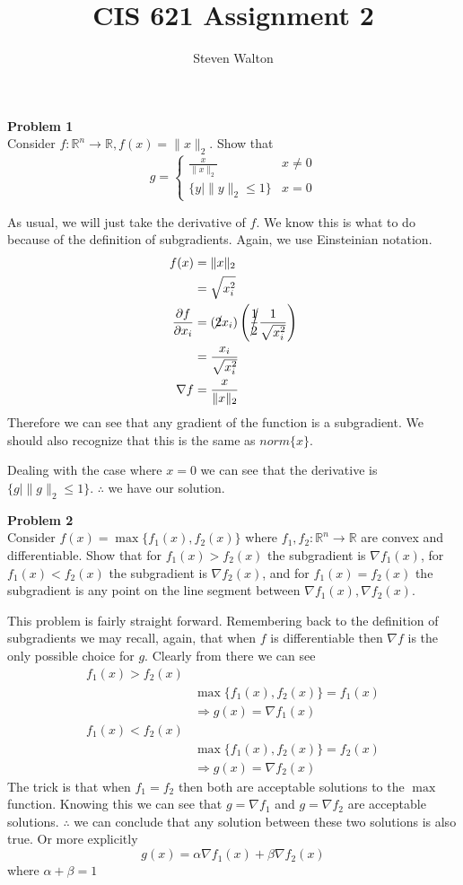 \documentclass[12pt,letter]{article}
\newcommand{\problem}[1]{\vspace{3mm}\Large\textbf{{Problem {#1}\vspace{3mm}}}\normalsize\\}
\begin{document}
\title{CIS 621 Assignment 2}
\author{Steven Walton}
\maketitle
\problem{1}
Consider $f:\mathbb{R}^n \rightarrow \mathbb{R}, f(x) = \|x\|_2$. Show that 
\[ 
g = 
\begin{cases}
    \frac{x}{\|x\|_2} & x \neq 0\\
    \{y | \|y\|_2 \leq 1\} & x = 0
\end{cases}
\]

As usual, we will just take the derivative of $f$. We know this is what to do
because of the definition of subgradients. Again, we use Einsteinian notation.
\begin{align*}
    f(x) &= \|x\|_2 \\
         &= \sqrt{x_i^2} \\
    \frac{\partial f}{\partial x_i} &= (\cancel{2}x_i)\left(\cancel{\frac12}\frac{1}{\sqrt{x_i^2}}\right) \\
         &= \frac{x_i}{\sqrt{x_i^2}} \\
    \nabla f&= \frac{x}{\|x\|_2}
\end{align*}
Therefore we can see that any gradient of the function is a subgradient. We 
should also recognize that this is the same as $norm\{x\}$. 

Dealing with the case where $x=0$ we can see that the derivative is 
$\{g | \|g\|_2 \leq 1\}$. $\therefore$ we have our solution.

\problem{2}
Consider $f(x) = \max\{f_1(x),f_2(x)\}$ where $f_1,f_2:\mathbb{R}^n\rightarrow
\mathbb{R}$ are convex and differentiable. Show that for $f_1(x) > f_2(x)$ the
subgradient is $\nabla f_1(x)$, for $f_1(x) < f_2(x)$ the subgradient is
$\nabla f_2(x)$, and for $f_1(x) = f_2(x)$ the subgradient is any point on the
line segment between $\nabla f_1(x), \nabla f_2(x)$.

This problem is fairly straight forward. Remembering back to the definition of
subgradients we may recall, again, that when $f$ is differentiable then $\nabla f$
is the only possible choice for $g$. Clearly from there we can see
\begin{align*}
    f_1(x) > f_2(x) & \\
        & \max\{f_1(x),f_2(x)\} = f_1(x) \\
        & \Rightarrow g(x) = \nabla f_1(x) \\
    f_1(x) < f_2(x) & \\
        & \max\{f_1(x),f_2(x)\} = f_2(x) \\
        & \Rightarrow g(x) = \nabla f_2(x)
\end{align*}
The trick is that when $f_1 = f_2$ then both are acceptable solutions to the 
$\max$ function. Knowing this we can see that $g=\nabla f_1$ and $g=\nabla f_2$ 
are acceptable solutions. $\therefore$ we can conclude that any solution 
between these two solutions is also true. Or more explicitly
\[
    g(x) = \alpha \nabla f_1(x) + \beta \nabla f_2(x)
\]
where $\alpha + \beta = 1$
\end{document}
